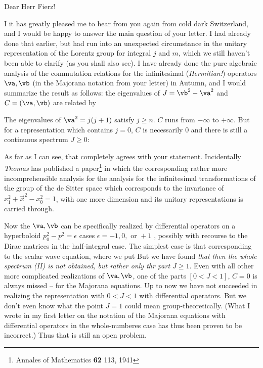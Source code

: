 \date{February 12, 1941}

\nc{\valpha}{\vec{\alpha}}
\nc{\vsigma}{\vec{\sigma}}
\nc{\vGamma}{\vec{\Gamma}}

Dear Herr Fierz!

I it has greatly pleased me to hear from you again from cold dark Switzerland, and I would be happy to answer the main question of your letter. I had already done that earlier, but had run into an unexpected circumstance in the unitary representation of the Lorentz group for integral $j$ and $m$, which we still haven't been able to clarify (as you shall also see). I have already done the pure algebraic analysis of the commutation relations for the infinitesimal (\textit{Hermitian!}) operators $\va, \vb$ (in the Majorana notation from your letter) in Autumn, and I would summarize the result as follows: the eigenvalues of $J = \vb^2 - \va^2$ and $C = (\va, \vb)$ are related by

The eigenvalues of $\va^2 = j(j+1)$ satisfy $j \ge n$. $C$ runs from $-\infty$ to $+\infty$. But for a representation which contains $j=0$, $C$ is necessarily $0$ and there is still a continuous spectrum $J\ge 0$:

As far as I can see, that completely agrees with your statement. Incidentally \textit{Thomas} has published a paper\footnote{Annales of Mathematics \textbf{62} 113, 1941} in which the corresponding rather more incomprehensible analysis for the analysis for the infinitesimal transformations of the group of the de Sitter space 
which corresponds to the invariance of $x_1^2 + \vec{x}^2 - x_0^2 = 1$, with one more dimension
 and its unitary representations is carried through.
 
Now the $\va, \vb$ can be specifically realized by differential operators on a hyperboloid $p_0^2 - p^2 = \epsilon$ 
cases $\epsilon = -1, 0, \text{ or } +1$
, possibly with recourse to the Dirac matrices in the half-integral case. The simplest case is that corresponding to the scalar wave equation, where we put
But we have found \textit{that then the whole spectrum (II) is not obtained, but rather only thr part $J \ge 1$}. Even with all other more complicated realizations of $\va, \vb$, one of the parts $[0<J<1]$, $C=0$ is always missed --  for the Majorana equations. Up to now we have not succeeded in realizing the representation with $0<J<1$ with differential operators. But we don't even know what the point $J=1$ could mean group-theoretically. (What I wrote in my first letter on the notation of the Majorana equations with differential operators in the whole-numberes case has thus been proven to be incorrect.) Thus that is still an open problem.

